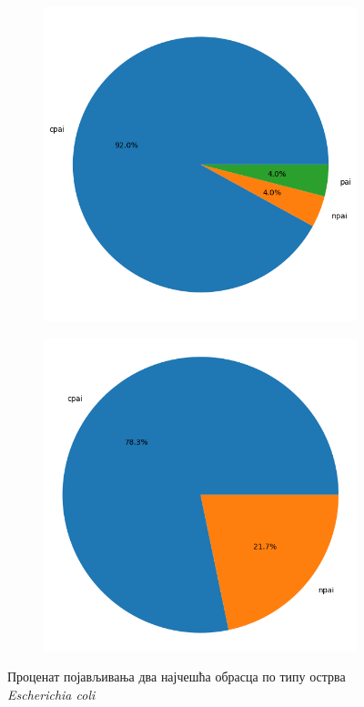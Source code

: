 \documentclass[12pt]{article}
\begin{document}
\begin{figure}[htbp]
    \centering
    \begin{subfigure}{0.48\linewidth}
        \centering
        \includegraphics[width=\linewidth]{images/top_1_by_islands.png}
    \end{subfigure}

    \begin{subfigure}{0.48\linewidth}
        \centering
        \includegraphics[width=\linewidth]{images/top_2_by_islands.png}
    \end{subfigure}
    \caption{Проценат појављивања два најчешћа обрасца по типу острва \textit{Escherichia coli}}
\end{figure}
\end{document}
